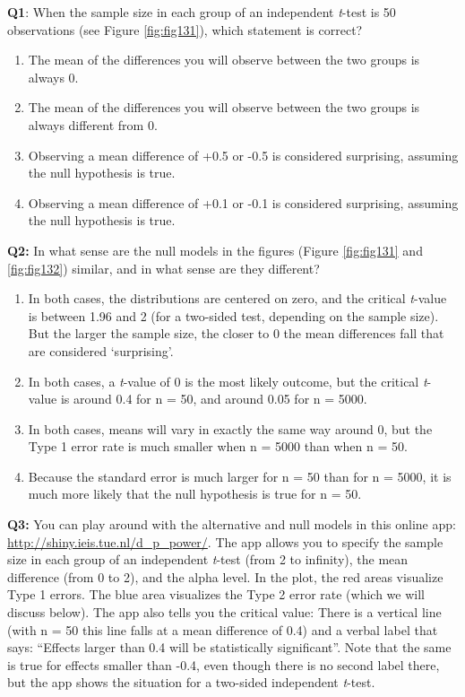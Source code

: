 \documentclass[
  oneside]{book}
\providecommand{\tightlist}{%
  \setlength{\itemsep}{0pt}\setlength{\parskip}{0pt}}
\begin{document}
\textbf{Q1}: When the sample size in each group of an independent \emph{t}-test is 50
observations (see Figure \ref{fig:fig131}), which statement is correct?

\begin{enumerate}
\def\labelenumi{\Alph{enumi})}
\tightlist
\item
  The mean of the differences you will observe between the two groups is always 0.
\item
  The mean of the differences you will observe between the two groups is always different from 0.
\item
  Observing a mean difference of +0.5 or -0.5 is considered surprising, assuming the null hypothesis is true.
\item
  Observing a mean difference of +0.1 or -0.1 is considered surprising, assuming the null hypothesis is true.
\end{enumerate}

\textbf{Q2:} In what sense are the null models in the figures (Figure \ref{fig:fig131} and \ref{fig:fig132}) similar, and in what sense are they different?

\begin{enumerate}
\def\labelenumi{\Alph{enumi})}
\tightlist
\item
  In both cases, the distributions are centered on zero, and the critical
  \emph{t}-value is between 1.96 and 2 (for a two-sided test, depending on the sample size). But the larger the sample size, the closer to 0 the mean differences fall that are considered `surprising'.
\item
  In both cases, a \emph{t}-value of 0 is the most likely outcome, but the critical \emph{t}-value is around 0.4 for n = 50, and around 0.05 for n = 5000.
\item
  In both cases, means will vary in exactly the same way around 0, but the Type 1 error rate is much smaller when n = 5000 than when n = 50.
\item
  Because the standard error is much larger for n = 50 than for n = 5000, it is much more likely that the null hypothesis is true for n = 50.
\end{enumerate}

\textbf{Q3:} You can play around with the alternative and null models in this online app: \url{http://shiny.ieis.tue.nl/d_p_power/}. The app allows you to specify the sample size in each group of an independent \emph{t}-test (from 2 to infinity), the mean difference (from 0 to 2), and the alpha level. In the plot, the red areas visualize Type 1 errors. The blue area visualizes the Type 2 error rate (which we will discuss below). The app also tells you the critical value: There is a vertical line (with n = 50 this line falls at a mean difference of 0.4) and a verbal label that says: ``Effects larger than 0.4 will be statistically significant''. Note that the same is true for effects smaller than -0.4, even though there is no second label there, but the app shows the situation for a two-sided independent \emph{t}-test.
\end{document}
